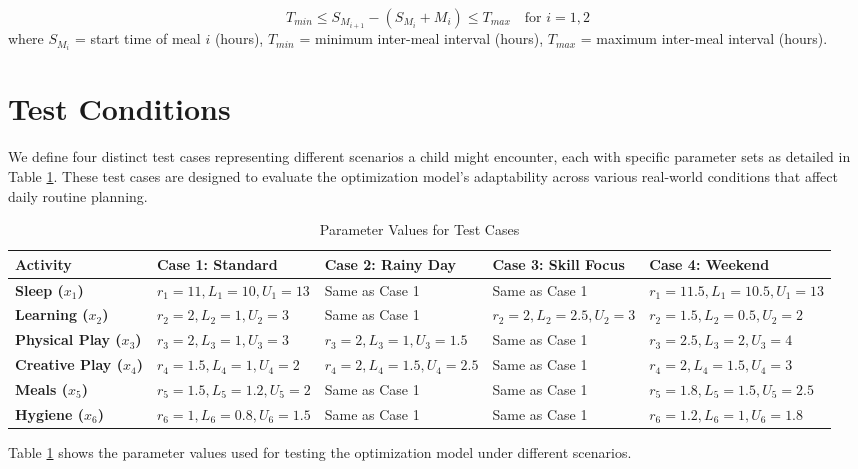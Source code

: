 \documentclass[10pt,conference,compsocconf]{IEEEtran}
\begin{document}
\begin{equation}
T_{min} \leq S_{M_{i+1}} - (S_{M_i} + M_i) \leq T_{max} \quad \text{for } i=1,2
\end{equation}
where $S_{M_i}$ = start time of meal $i$ (hours), $T_{min}$ = minimum inter-meal interval (hours), $T_{max}$ = maximum inter-meal interval (hours).

\section{Test Conditions}

We define four distinct test cases representing different scenarios a child might encounter, each with specific parameter sets as detailed in Table \ref{tab:testcases}. These test cases are designed to evaluate the optimization model's adaptability across various real-world conditions that affect daily routine planning.

\begin{table}[htbp]
\caption{Parameter Values for Test Cases}
\begin{center}
\begin{tabular}{|p{1.8cm}|p{2.2cm}|p{2.2cm}|p{2.2cm}|p{2.2cm}|}
\hline
\textbf{Activity} & \textbf{Case 1: Standard} & \textbf{Case 2: Rainy Day} & \textbf{Case 3: Skill Focus} & \textbf{Case 4: Weekend} \\
\hline
\textbf{Sleep ($x_1$)} & $r_1=11, L_1=10, U_1=13$ & Same as Case 1 & Same as Case 1 & $r_1=11.5, L_1=10.5, U_1=13$ \\
\hline
\textbf{Learning ($x_2$)} & $r_2=2, L_2=1, U_2=3$ & Same as Case 1 & $r_2=2, L_2=2.5, U_2=3$ & $r_2=1.5, L_2=0.5, U_2=2$ \\
\hline
\textbf{Physical Play ($x_3$)} & $r_3=2, L_3=1, U_3=3$ & $r_3=2, L_3=1, U_3=1.5$ & Same as Case 1 & $r_3=2.5, L_3=2, U_3=4$ \\
\hline
\textbf{Creative Play ($x_4$)} & $r_4=1.5, L_4=1, U_4=2$ & $r_4=2, L_4=1.5, U_4=2.5$ & Same as Case 1 & $r_4=2, L_4=1.5, U_4=3$ \\
\hline
\textbf{Meals ($x_5$)} & $r_5=1.5, L_5=1.2, U_5=2$ & Same as Case 1 & Same as Case 1 & $r_5=1.8, L_5=1.5, U_5=2.5$ \\
\hline
\textbf{Hygiene ($x_6$)} & $r_6=1, L_6=0.8, U_6=1.5$ & Same as Case 1 & Same as Case 1 & $r_6=1.2, L_6=1, U_6=1.8$ \\
\hline
\end{tabular}
\label{tab:testcases}
\end{center}
\end{table}
Table \ref{tab:testcases} shows the parameter values used for testing the optimization model under different scenarios.
\end{document}
